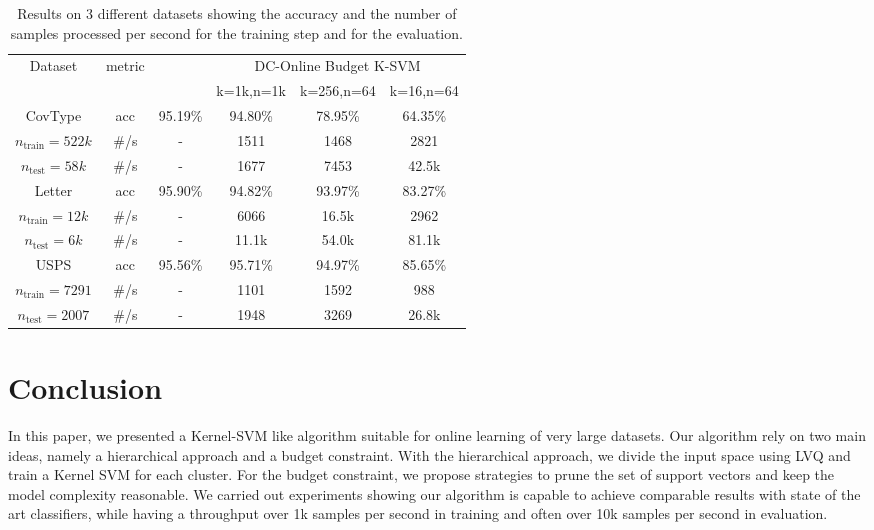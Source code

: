 \documentclass[10pt,final,a4paper]{article}
\begin{document}
\begin{table}
\centering
\begin{tabular}{|c|c|c|c|c|c|}
\hline
\multirow{2}{*}{Dataset} & \multirow{2}{*}{metric} & \multirow{2}{*}{\cite{hsieh14nips}} & \multicolumn{3}{c|}{DC-Online Budget K-SVM} \\
\cline{4-6}
        &        &           & k=1k,n=1k & k=256,n=64 & k=16,n=64\\
\hline
\hline
CovType & acc & 95.19\% & 94.80\% & 78.95\% & 64.35\% \\
$n_\text{train} = 522k$        & \#/s & -      & 1511 & 1468 &  2821 \\
$n_\text{test} = 58k$        & \#/s & - & 1677 & 7453 & 42.5k \\
\hline
Letter & acc & 95.90\% & 94.82\% & 93.97\% & 83.27\%\\
$n_\text{train} = 12k$        & \#/s & -      & 6066  & 16.5k & 2962 \\
$n_\text{test} = 6k$        & \#/s & -        & 11.1k & 54.0k & 81.1k \\
\hline
USPS & acc & 95.56\%  & 95.71\% & 94.97\% & 85.65\%\\
$n_\text{train} = 7291$        & \#/s & -      & 1101 & 1592 & 988  \\
$n_\text{test} = 2007$        & \#/s & -       & 1948 & 3269 & 26.8k \\
\hline	
\end{tabular}
\caption{Results on 3 different datasets showing the accuracy and the number of samples processed per second for the training step and for the evaluation.}
\label{tab:res}
\end{table}

\section{Conclusion}

In this paper, we presented a Kernel-SVM like algorithm suitable for online learning of very large datasets.
Our algorithm rely on two main ideas, namely a hierarchical approach and a budget constraint.
With the hierarchical approach, we divide the input space using LVQ and train a Kernel SVM for each cluster.
For the budget constraint, we propose strategies to prune the set of support vectors and keep the model complexity reasonable.
We carried out experiments showing our algorithm is capable to achieve comparable results with state of the art classifiers, while having a throughput over 1k samples per second in training and often over 10k samples per second in evaluation.





\end{document}
